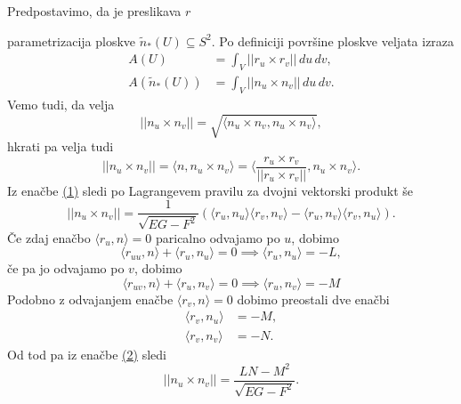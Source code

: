Predpostavimo, da je preslikava $r$ \begin{center}
\end{center}
parametrizacija ploskve $\tilde{n}_{*}(U) \subseteq S^2$. Po definiciji površine ploskve veljata izraza \begin{align*}
    A(U) &= \int_{V} \lvert\lvert r_u \times  r_v \rvert\rvert   \, du \, dv,  \\
    A(\tilde{n}_{*}(U)) &= \int_{V} \lvert\lvert n_u \times  n_v \rvert\rvert  \, du \, dv. 
\end{align*}
Vemo tudi, da velja \begin{equation*}\label{eq_1}
  \lvert\lvert n_u \times  n_v \rvert\rvert = \sqrt{\langle n_u \times n_v, n_u \times  n_v \rangle }, 
\end{equation*}  
hkrati pa velja tudi \begin{equation}
  \lvert\lvert n_u \times  n_v \rvert\rvert = \langle n, n_u \times n_v \rangle = \langle \frac{r_u \times r_v}{\lvert\lvert r_u \times  r_v \rvert\rvert } , n_u \times n_v \rangle .
\end{equation}  
Iz enačbe \href{eq_1}{(1)} sledi po Lagrangevem pravilu za dvojni vektorski produkt še \begin{equation} \label{eq_2}
  \lvert\lvert n_u \times  n_v \rvert\rvert = \frac{1}{\sqrt{EG - F^2} } (\langle r_u, n_u \rangle \langle r_v, n_v \rangle - \langle r_u, n_v \rangle \langle r_v, n_u \rangle  ).
\end{equation}  
Če zdaj enačbo $\langle r_u, n \rangle = 0$ paricalno odvajamo po $u$, dobimo \begin{equation*}
\langle r_{uu}, n \rangle + \langle r_u, n_u \rangle = 0 \implies \langle r_u, n_u \rangle = - L,  
\end{equation*}  
če pa jo odvajamo po $v$, dobimo \begin{equation*}
\langle r_{uv}, n \rangle + \langle r_u, n_v \rangle = 0 \implies  \langle r_u, n_v \rangle = - M
\end{equation*}  
Podobno z odvajanjem enačbe $\langle r_v, n \rangle = 0$ dobimo preostali dve enačbi \begin{align*}
  \langle r_v, n_u \rangle  &= - M, \\
  \langle r_v, n_v \rangle  &= - N.
\end{align*}
Od tod pa iz enačbe \href{eq_2}{(2)} sledi \begin{equation*}
  \lvert\lvert n_u \times  n_v \rvert\rvert = \frac{LN - M^2}{\sqrt{EG - F^2} }.
\end{equation*}  

